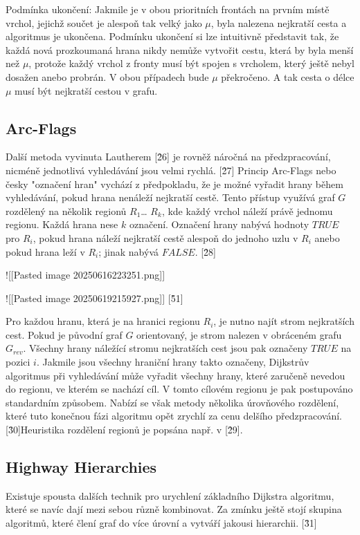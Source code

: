 Podmínka ukončení: Jakmile je v obou prioritních frontách na prvním místě vrchol, jejichž součet je alespoň tak velký jako $\mu$, byla nalezena nejkratší cesta a algoritmus je ukončena. Podmínku ukončení si lze intuitivně představit tak, že každá nová prozkoumaná hrana nikdy nemůže vytvořit cestu, která by byla menší než $\mu$, protože každý vrchol z fronty musí být spojen s vrcholem, který ještě nebyl dosažen anebo probrán. V obou případech bude $\mu$ překročeno. A tak cesta o délce $\mu$ musí být nejkratší cestou v grafu.


\subsection{ Arc-Flags}
Další metoda vyvinuta Lautherem [\^26] je rovněž náročná na předzpracování, nicméně jednotlivá vyhledávání jsou velmi rychlá. [\^27] Princip Arc-Flags nebo česky "označení hran" vychází z předpokladu, že je možné vyřadit hrany během vyhledávání, pokud hrana nenáleží nejkratší cestě. Tento přístup využívá graf $G$ rozdělený na několik regionů $R_1$… $R_k$, kde každý vrchol náleží právě jednomu regionu. Každá hrana nese $k$ označení. Označení hrany nabývá hodnoty $TRUE$ pro $R_i$, pokud hrana náleží nejkratší cestě alespoň do jednoho uzlu v $R_i$ anebo pokud hrana leží v $R_i$; jinak nabývá $FALSE$. [\^28]

![[Pasted image 20250616223251.png]] 

![[Pasted image 20250619215927.png]] [\^51]

Pro každou hranu, která je na hranici regionu $R_i$, je nutno najít strom nejkratších cest. Pokud je původní graf $G$ orientovaný, je strom nalezen v obráceném grafu $G_{rev}$. Všechny hrany náležící stromu nejkratších cest jsou pak označeny $TRUE$ na pozici $i$. Jakmile jsou všechny hraniční hrany takto označeny, Dijkstrův algoritmus při vyhledávání může vyřadit všechny hrany, které zaručeně nevedou do regionu, ve kterém se nachází cíl. V tomto cílovém regionu je pak postupováno standardním způsobem. Nabízí se však metody několika úrovňového rozdělení, které tuto konečnou fázi algoritmu opět zrychlí za cenu delšího předzpracování. [\^30]Heuristika rozdělení regionů je popsána např. v [\^29].

\subsection{ Highway Hierarchies}
Existuje spousta dalších technik pro urychlení základního Dijkstra algoritmu, které se navíc dají mezi sebou různě kombinovat. Za zmínku ještě stojí skupina algoritmů, které člení graf do více úrovní a vytváří jakousi hierarchii. [\^31] 

